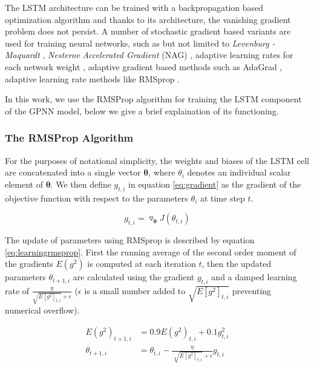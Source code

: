 The LSTM architecture can be trained with a backpropagation based optimization algorithm and thanks 
to its architecture, the vanishing gradient problem does not persist. A number of stochastic 
gradient based variants are used for training neural networks, such as but not limited to 
\emph{Levenburg - Maquardt} \citep{marquardt1963algorithm}, \emph{Nesterov Accelerated Gradient} (NAG) 
\citep{nesterov1983method}, adaptive learning rates for each network weight \citep{SilvaAlmeida}, adaptive gradient 
based methods such as AdaGrad \citep{duchi2011adaptive}, adaptive learning rate methods like RMSprop \citep{tieleman2012lecture}. 

In this work, we use the RMSProp algorithm for training the LSTM component of the GPNN model, 
below we give a brief explaination of its functioning.

\subsubsection*{The RMSProp Algorithm}

For the purposes of notational simplicity, the weights and biases of the LSTM cell are 
concatenated into a single vector $\mathbf{\theta}$, where $\theta_i$ denotes an individual 
scalar element of $\mathbf{\theta}$. We then define $g_{t,i}$ in equation \ref{eq:gradient} as the 
gradient of the objective function with respect to the parameters $\theta_{i}$ at time step $t$. 

\begin{equation}\label{eq:gradient}
 g_{t,i} = \triangledown_{ \mathbf{\theta} } J \left(  \theta_{t,i} \right)
\end{equation}

The update of parameters using RMSprop is described by equation \ref{eq:learningrmsprop}. First the running average 
of the second order moment of the gradients $  E \left( g^{2} \right)  $ is computed at each iteration $t$, then 
the updated parameters $\theta_{t+1,i}$ are calculated using the gradient $g_{t,i}$ and a damped learning rate of 
$\frac{\eta}{\sqrt{E \left[ g^{2} \right]_{t,i}} + \epsilon }$ ($\epsilon$ is a small number added to 
$\sqrt{E \left[ g^{2} \right]_{t,i}}$ preventing numerical overflow).


\begin{align}\label{eq:learningrmsprop}
 E \left( g^{2} \right)_{t+1,i} &= 0.9 E \left( g^{2} \right)_{t,i} + 0.1 g_{t,i}^{2}  \\ 
 \theta_{t+1,i} &= \theta_{t,i} - \frac{ \eta }{\sqrt[]{E \left[ g^{2} \right]_{t,i}} + \epsilon } g_{t,i}
\end{align}

